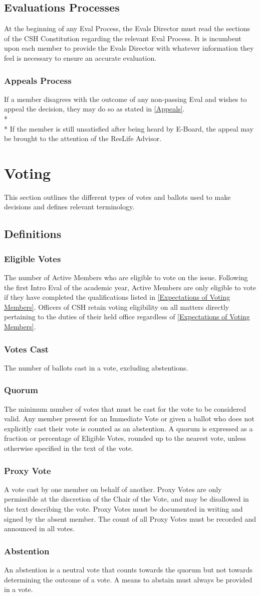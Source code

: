 \documentclass{article}
\newcommand{\article}[1]{\section{#1} \label{#1}}
\newcommand{\asection}[1]{\subsection{#1} \label{#1}}
\newcommand{\asubsection}[1]{\subsubsection{#1} \label{#1}}
\begin{document}
\asection{Evaluations Processes}
At the beginning of any Eval Process, the Evals Director must read the sections of the CSH Constitution regarding the relevant Eval Process.
It is incumbent upon each member to provide the Evals Director with whatever information they feel is necessary to ensure an accurate evaluation.

\asubsection{Appeals Process}
If a member disagrees with the outcome of any non-passing Eval and wishes to appeal the decision, they may do so as stated in \ref{Appeals}.
\\* \\*
If the member is still unsatisfied after being heard by E-Board, the appeal may be brought to the attention of the ResLife Advisor.

\article{Voting}
This section outlines the different types of votes and ballots used to make decisions and defines relevant terminology.

\asection{Definitions}

\asubsection{Eligible Votes}
The number of Active Members who are eligible to vote on the issue.
Following the first Intro Eval of the academic year, Active Members are only eligible to vote if they have completed the qualifications listed in \ref{Expectations of Voting Members}.
Officers of CSH retain voting eligibility on all matters directly pertaining to the duties of their held office regardless of \ref{Expectations of Voting Members}.

\asubsection{Votes Cast}
The number of ballots cast in a vote, excluding abstentions.

\asubsection{Quorum}
The minimum number of votes that must be cast for the vote to be considered valid.
Any member present for an Immediate Vote or given a ballot who does not explicitly cast their vote is counted as an abstention.
A quorum is expressed as a fraction or percentage of Eligible Votes, rounded up to the nearest vote, unless otherwise specified in the text of the vote.

\asubsection{Proxy Vote}
A vote cast by one member on behalf of another.
Proxy Votes are only permissible at the discretion of the Chair of the Vote, and may be disallowed in the text describing the vote.
Proxy Votes must be documented in writing and signed by the absent member.
The count of all Proxy Votes must be recorded and announced in all votes.

\asubsection{Abstention}
An abstention is a neutral vote that counts towards the quorum but not towards determining the outcome of a vote.
A means to abstain must always be provided in a vote.
\end{document}
